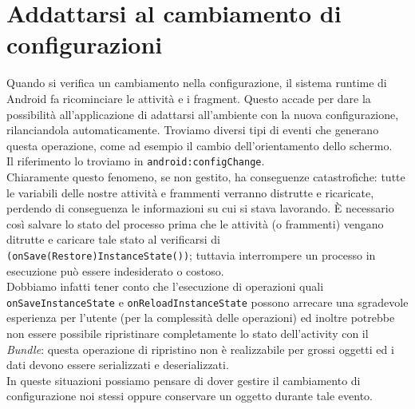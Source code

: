 %

% 


\chapter{Addattarsi al cambiamento di configurazioni}
Quando si verifica un cambiamento nella configurazione, il sistema runtime di
Android fa ricominciare le attività e i fragment. Questo accade per dare la
possibilità all'applicazione di adattarsi all'ambiente con la nuova
configurazione, rilanciandola automaticamente. Troviamo diversi tipi di eventi
che generano questa operazione, come ad esempio il cambio dell'orientamento
dello schermo.\\
Il riferimento lo troviamo in \texttt{android:configChange}.\\
Chiaramente questo fenomeno, se non gestito, ha conseguenze catastrofiche: tutte
le variabili delle nostre attività e frammenti verranno distrutte e ricaricate,
perdendo di conseguenza le informazioni su cui si stava lavorando. È necessario
così salvare lo stato del processo prima che le attività (o frammenti) vengano
ditrutte e caricare tale stato al verificarsi di
\texttt{(onSave(Restore)InstanceState())}; tuttavia interrompere un processo in
esecuzione può essere indesiderato o costoso.\\
Dobbiamo infatti tener conto che l'esecuzione di operazioni quali
\texttt{onSaveInstanceState} e \texttt{onReloadInstanceState} possono arrecare
una sgradevole esperienza per l'utente (per la complessità delle operazioni) ed
inoltre potrebbe non essere possibile ripristinare completamente lo stato
dell'activity con il \textit{Bundle}: questa operazione di ripristino non è
realizzabile per grossi oggetti ed i dati devono essere serializzati e
deserializzati.\\
In queste situazioni possiamo pensare di dover gestire il cambiamento di
configurazione noi stessi oppure conservare un oggetto durante tale evento.
